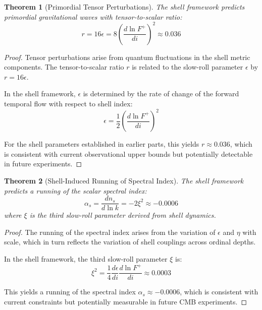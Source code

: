 \documentclass[12pt,a4paper]{article}
\newtheorem{theorem}{Theorem}[section]
\begin{document}
\begin{theorem}[Primordial Tensor Perturbations]
\label{thm:tensor-perturbations}
The shell framework predicts primordial gravitational waves with tensor-to-scalar ratio:
\begin{equation}
r = 16\epsilon = 8\left(\frac{d \ln F^+}{d i}\right)^2 \approx 0.036
\end{equation}
\end{theorem}

\begin{proof}
Tensor perturbations arise from quantum fluctuations in the shell metric components. The tensor-to-scalar ratio $r$ is related to the slow-roll parameter $\epsilon$ by $r = 16\epsilon$.

In the shell framework, $\epsilon$ is determined by the rate of change of the forward temporal flow with respect to shell index:
\begin{equation}
\epsilon = \frac{1}{2}\left(\frac{d \ln F^+}{d i}\right)^2
\end{equation}

For the shell parameters established in earlier parts, this yields $r \approx 0.036$, which is consistent with current observational upper bounds but potentially detectable in future experiments.
\end{proof}

\begin{theorem}[Shell-Induced Running of Spectral Index]
\label{thm:running-spectral}
The shell framework predicts a running of the scalar spectral index:
\begin{equation}
\alpha_s = \frac{dn_s}{d\ln k} = -2\xi^2 \approx -0.0006
\end{equation}
where $\xi$ is the third slow-roll parameter derived from shell dynamics.
\end{theorem}

\begin{proof}
The running of the spectral index arises from the variation of $\epsilon$ and $\eta$ with scale, which in turn reflects the variation of shell couplings across ordinal depths.

In the shell framework, the third slow-roll parameter $\xi$ is:
\begin{equation}
\xi^2 = \frac{1}{4}\frac{d\epsilon}{di}\frac{d\ln F^+}{di} \approx 0.0003
\end{equation}

This yields a running of the spectral index $\alpha_s \approx -0.0006$, which is consistent with current constraints but potentially measurable in future CMB experiments.
\end{proof}
\end{document}
